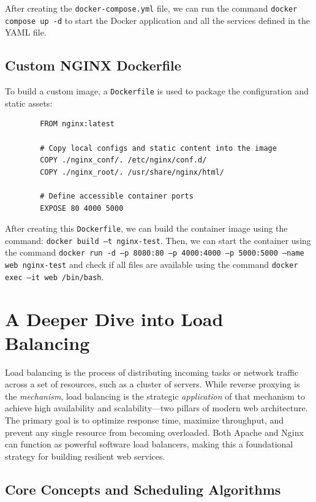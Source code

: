 \documentclass{scrbook}
\begin{document}
	After creating the \texttt{docker-compose.yml} file, we can run the command \texttt{docker compose up -d} to start the Docker application and all the services defined in the YAML file.
	
	\section{Custom NGINX Dockerfile}
	
	To build a custom image, a \texttt{Dockerfile} is used to package the configuration and static assets:
	
	\begin{lstlisting}
		FROM nginx:latest
		
		# Copy local configs and static content into the image
		COPY ./nginx_conf/. /etc/nginx/conf.d/
		COPY ./nginx_root/. /usr/share/nginx/html/
		
		# Define accessible container ports
		EXPOSE 80 4000 5000
	\end{lstlisting}
	
	After creating this \texttt{Dockerfile}, we can build the container image using the command: \texttt{docker build –t nginx-test}. Then, we can start the container using the command \texttt{docker run -d –p 8080:80 –p 4000:4000 –p 5000:5000 --name web nginx-test} and check if all files are available using the command \texttt{docker exec –it web /bin/bash}.
	
	\chapter{A Deeper Dive into Load Balancing}
	
	Load balancing is the process of distributing incoming tasks or network traffic across a set of resources, such as a cluster of servers. While reverse proxying is the \emph{mechanism}, load balancing is the strategic \emph{application} of that mechanism to achieve high availability and scalability---two pillars of modern web architecture. The primary goal is to optimize response time, maximize throughput, and prevent any single resource from becoming overloaded. Both Apache and Nginx can function as powerful software load balancers, making this a foundational strategy for building resilient web services.
	
	\section{Core Concepts and Scheduling Algorithms}
	
\end{document}
